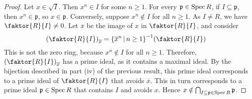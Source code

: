 \begin{proof}
    Let \( x \in \sqrt{I} \).
    Then \( x^n \in I \) for some \( n \geq 1 \).
    For every \( \mathfrak p \in \operatorname{Spec} R \), if \( I \subseteq \mathfrak p \), then \( x^n \in \mathfrak p \), so \( x \in \mathfrak p \).
    Conversely, suppose \( x^n \notin I \) for all \( n \geq 1 \).
    As \( I \neq R \), we have \( \faktor{R}{I} \neq 0 \).
    Let \( \overline x \) be the image of \( x \) in \( \faktor{R}{I} \), and consider
    \[ \qty(\faktor{R}{I})_{\overline x} = \qty{\overline x^n \midd n \geq 1}^{-1} \qty(\faktor{R}{I}) \]
    This is not the zero ring, because \( x^n \notin I \) for all \( n \geq 1 \).
    Therefore, \( \qty(\faktor{R}{I})_{\overline x} \) has a prime ideal, as it contains a maximal ideal.
    By the bijection described in part (iv) of the previous result, this prime ideal corresponds to a prime ideal of \( \faktor{R}{I} \) that avoids \( \overline x \).
    This in turn corresponds to a prime ideal \( \mathfrak p \in \operatorname{Spec} R \) that contains \( I \) and avoids \( x \).
    Hence \( x \notin \bigcap_{I \subseteq \mathfrak p \in \operatorname{Spec} R} \mathfrak p \).
\end{proof}
